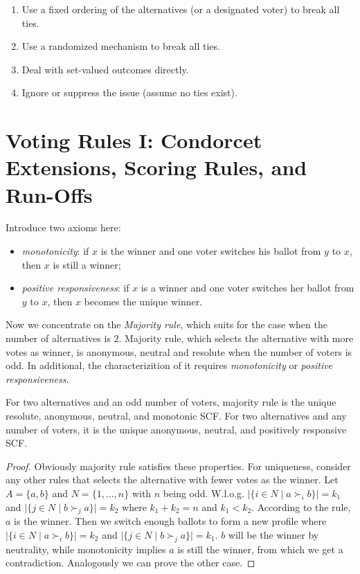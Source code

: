 \begin{enumerate}
    \item Use a fixed ordering of the alternatives (or a designated voter) to break all ties.
    \item Use a randomized mechanism to break all ties.
    \item Deal with set-valued outcomes directly.
    \item Ignore or suppress the issue (assume no ties exist).
\end{enumerate}

\section{Voting Rules I: Condorcet Extensions, Scoring Rules, and Run-Offs}

Introduce two axioms here:\\

\begin{definition}
    \begin{itemize}
        \item \textit{monotonicity}: if $x$ is the winner and one voter switches his ballot from $y$ to $x$, then $x$ is still a winner; 
        \item \textit{positive responsiveness}: if $x$ is a winner and one voter switches her ballot from $y$ to $x$, then $x$ becomes the unique winner.
    \end{itemize}
\end{definition}

Now we concentrate on the \textit{Majority rule}, which suits for the case when the number of alternatives is $2$. Majority rule, which selects the alternative with more votes as winner, is anonymous, neutral and resolute when the number of voters is odd. In additional, the characterizition of it requires \textit{monotonicity} or \textit{positive responsiveness}.

\begin{proposition}
    \label{ThMay}
    For two alternatives and an odd number of voters, majority rule is the unique resolute, anonymous, neutral, and monotonic SCF. For two alternatives and any number of voters, it is the unique anonymous, neutral, and positively responsive SCF.
\end{proposition}

\begin{proof}
    Obviously majority rule satisfies these properties. For uniqueness, consider any other rules that selects the alternative with fewer votes as the winner. Let $A = \{a,b\}$ and $N = \{1,\dots,n\}$ with $n$ being odd. W.l.o.g. $|\{i \in N\;|\; a \succ_i b\}| = k_1$ and $|\{j \in N\;|\; b \succ_j a\}| = k_2$ where $k_1 + k_2 = n$ and $k_1 < k_2$. According to the rule, $a$ is the winner. Then we switch enough ballots to form a new profile where $|\{i \in N\;|\; a \succ_i b\}| = k_2$ and $|\{j \in N\;|\; b \succ_j a\}| = k_1$. $b$ will be the winner by neutrality, while monotonicity implies $a$ is still the winner, from which we get a contradiction. Analogously we can prove the other case.
\end{proof}

